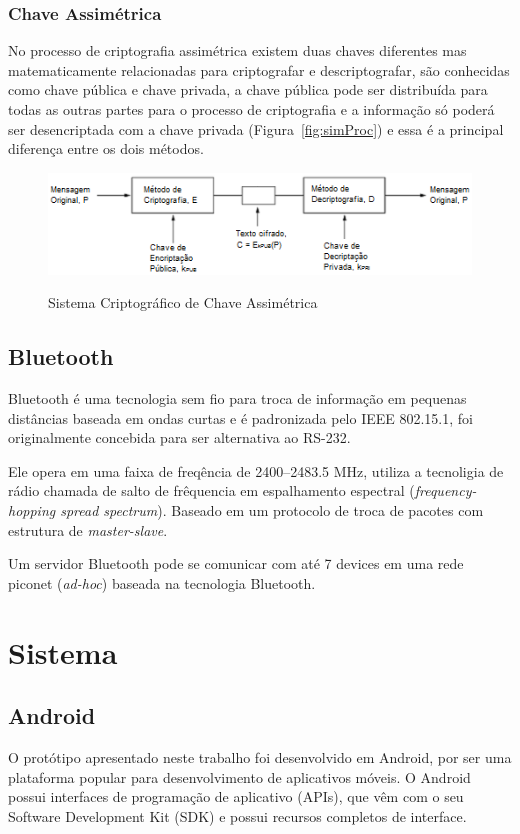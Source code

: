 \documentclass[12pt]{article}
\begin{document}
\subsubsection{Chave Assimétrica}

No processo de criptografia assimétrica existem duas chaves diferentes mas matematicamente relacionadas para criptografar e descriptografar, são conhecidas como chave pública e chave privada, a chave pública pode ser distribuída para todas as outras partes para o processo de criptografia e a informação só poderá ser desencriptada com a chave privada (Figura~\ref{fig:simProc}) e essa é a principal diferença entre os dois métodos.

\begin{figure}[ht]
\centering
\includegraphics[width=.7\textwidth]{images/process_assim.png}
\caption{Sistema Criptográfico de Chave Assimétrica} \cite{mikhail:2010}
\label{fig:assimProc}
\end{figure}

\subsection{Bluetooth}
Bluetooth é uma tecnologia sem fio para troca de informação em pequenas distâncias baseada em ondas curtas e é padronizada pelo IEEE 802.15.1, foi originalmente concebida para ser alternativa ao RS-232. 

Ele opera em uma faixa de freqência de 2400–2483.5 MHz, utiliza a tecnoligia de rádio chamada de salto de frêquencia em espalhamento espectral (\textit{frequency-hopping spread spectrum}). Baseado em um protocolo de troca de pacotes com estrutura de \textit{master-slave}.

Um servidor Bluetooth pode se comunicar com até 7 devices em uma rede piconet (\textit{ad-hoc}) baseada na tecnologia Bluetooth.
\section{Sistema}
\subsection{Android}
O protótipo apresentado neste trabalho foi desenvolvido em Android, por ser uma plataforma popular para desenvolvimento de aplicativos móveis. O Android possui interfaces de programação de aplicativo (APIs), que vêm com o seu Software Development Kit (SDK) e possui recursos completos de interface\cite{android:2014}.
\end{document}
